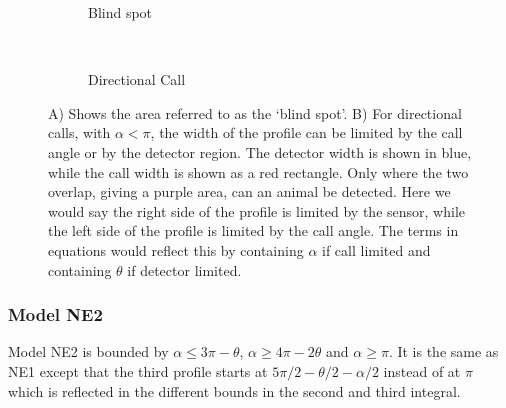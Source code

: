 \begin{figure}[t]
        \centering
        \begin{subfigure}[t]{0.3\textwidth}
                \centering
                \caption{Blind spot}
                \label{f:blindSpot}
        \end{subfigure}
~ 
        \begin{subfigure}[t]{0.3\textwidth}
                \centering
                \caption{Directional Call}
                \label{f:callExplained}
        \end{subfigure}
\caption{A) Shows the area referred to as the `blind spot'. B) For directional calls, with $\alpha<\pi$, the width of the profile can be limited by the call angle or by the detector region.  The detector width is shown in blue, while the call width is shown as a red rectangle. Only where the two overlap, giving a purple area, can an animal be detected. Here we would say the right side of the profile is limited by the sensor, while the left side of the profile is limited by the call angle. The terms in equations would reflect this by containing $\alpha$ if call limited and containing $\theta$ if detector limited.  }
\label{f:NE}
\end{figure}




\subsubsection{Model NE2} \label{NE2}

Model NE2 is bounded by $\alpha \le 3\pi - \theta$, $\alpha \ge 4\pi - 2\theta$ and $\alpha \ge \pi$. It is the same as NE1 except that the third profile starts at $5\pi/2 - \theta/2 - \alpha/2$ instead of at $\pi$ which is reflected in the different bounds in the second and third integral.



